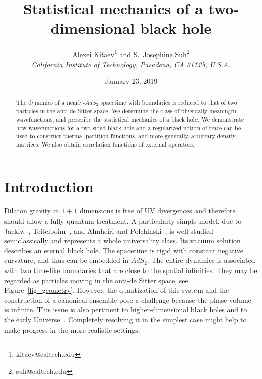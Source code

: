 \documentclass[11pt]{article}
\title {Statistical mechanics of a two-dimensional black hole}
\author{Alexei Kitaev\footnote{kitaev@caltech.edu}\; and
S.\ Josephine Suh\footnote{suh@caltech.edu}\\
\normalsize\it California Institute of Technology, Pasadena, CA 91125, U.S.A.\vspace{0.5cm}}
\date{January 23, 2019}
\DeclareMathOperator{\AdS}{AdS}
\def\widetilde#1{#1}%
\def\AdS{AdS}
\begin{document}
\setcounter{tocdepth}{2}

\maketitle
\begin{abstract}
The dynamics of a nearly-$\AdS_2$ spacetime with boundaries is reduced to that of two particles in the anti-de Sitter space. We determine the class of physically meaningful wavefunctions, and prescribe the statistical mechanics of a black hole. We demonstrate how wavefunctions for a two-sided black hole and a regularized notion of trace can be used to construct thermal partition functions, and more generally, arbitrary density matrices. We also obtain correlation functions of external operators.
\end{abstract}

\tableofcontents
\newpage

\section{Introduction}

Dilaton gravity in $1+1$ dimensions is free of UV divergences and therefore should allow a fully quantum treatment. A particularly simple model, due to Jackiw~\cite{Ja85}, Teitelboim~\cite{Te83}, and Almheiri and Polchinski~\cite{AlPo14}, is well-studied semiclassically and represents a whole universality class. Its vacuum solution describes an eternal black hole. The spacetime is rigid with constant negative curvature, and thus can be embedded in $\widetilde{\AdS}_2$. The entire dynamics is associated with two time-like boundaries that are close to the spatial infinities. They may be regarded as particles moving in the anti-de Sitter space, see Figure~\ref{fig_geometry}. However, the quantization of this system and the construction of a canonical ensemble pose a challenge because the phase volume is infinite. This issue is also pertinent to higher-dimensional black holes and to the early Universe~\cite{HaHa83}. Completely resolving it in the simplest case might help to make progress in the more realistic settings.
\end{document}
